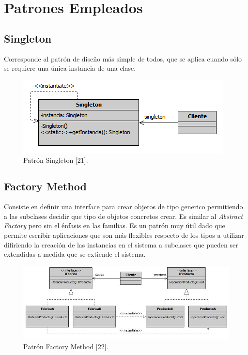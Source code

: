 \section{Patrones Empleados}

\subsection{Singleton}
\label{singleton}       
Corresponde al patrón de diseño más simple de todos, que se aplica cuando sólo se requiere una única instancia de una clase.

\begin{figure}[h!]
	\hspace*{3.5cm} \includegraphics[scale=0.7]{image/singleton.png}
	\caption{Patrón Singleton [21].}	
\end{figure} 

\subsection{Factory Method}
\label{factoryMethod}
Consiste en definir una interface para crear objetos de tipo generico permitiendo a las subclases decidir que tipo de objetos concretos crear. Es similar al \emph{Abstract Factory} pero sin el énfasis en las familias. Es un patrón muy útil dado que permite escribir aplicaciones que son más flexibles respecto de los tipos a utilizar difiriendo la creación de las instancias en el sistema a subclases que pueden ser extendidas a medida que se extiende el sistema. 

\begin{figure}[h!]
	\hspace*{1cm}\includegraphics[scale=0.4]{image/factoryMethod.png}
	\caption{Patrón Factory Method [22].}	
\end{figure} 

